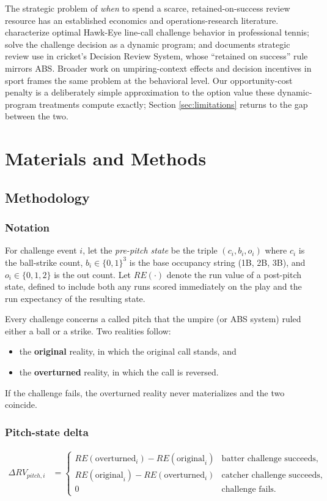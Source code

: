The strategic problem of \emph{when} to spend a scarce, retained-on-success
review resource has an established economics and operations-research
literature. \citet{abramitzky2012} characterize optimal
Hawk-Eye line-call challenge behavior in professional tennis; \citet{clarkenorman2012} solve the challenge decision as a dynamic
program; and \citet{shivakumar2018} documents strategic review use
in cricket's Decision Review System, whose ``retained on success'' rule
mirrors ABS. Broader work on umpiring-context effects and decision incentives
in sport \citep{scorecasting} frames the same problem at the behavioral level.
Our opportunity-cost penalty is a deliberately simple approximation to the
option value these dynamic-program treatments compute exactly; Section
\ref{sec:limitations} returns to the gap between the two.

\section{Materials and Methods}

\subsection{Methodology}
\label{sec:method}

\subsubsection{Notation}
For challenge event $i$, let the \emph{pre-pitch state} be the triple
$(c_i, b_i, o_i)$ where $c_i$ is the ball-strike count, $b_i \in \{0,1\}^3$ is
the base occupancy string (1B, 2B, 3B), and $o_i \in \{0,1,2\}$ is the out
count. Let $RE(\cdot)$ denote the run value of a post-pitch state, defined to
include both any runs scored immediately on the play and the run expectancy of
the resulting state.

Every challenge concerns a called pitch that the umpire (or ABS system) ruled
either a ball or a strike. Two realities follow:
\begin{itemize}
  \item the \textbf{original} reality, in which the original call stands, and
  \item the \textbf{overturned} reality, in which the call is reversed.
\end{itemize}
If the challenge fails, the overturned reality never materializes and the two
coincide.

\subsubsection{Pitch-state delta}
\begin{align}
\Delta RV_{pitch,i} &=
\begin{cases}
RE(\text{overturned}_i) - RE(\text{original}_i)
  & \text{batter challenge succeeds}, \\[4pt]
RE(\text{original}_i) - RE(\text{overturned}_i)
  & \text{catcher challenge succeeds}, \\[4pt]
0 & \text{challenge fails}.
\end{cases}
\end{align}


